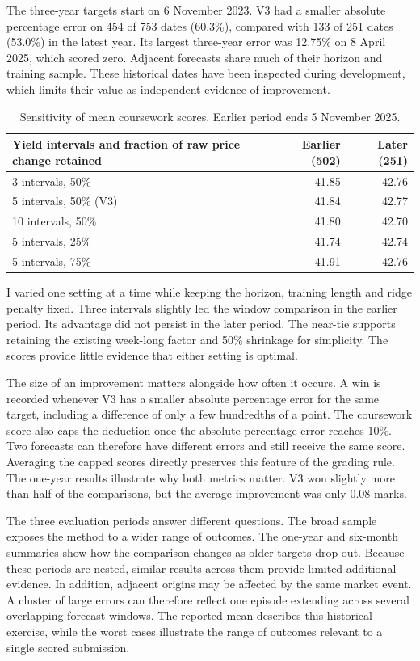 \documentclass[11pt,a4paper]{article}
\begin{document}
The three-year targets start on 6 November 2023. V3 had a smaller absolute percentage error on 454 of 753 dates (60.3\%), compared with 133 of 251 dates (53.0\%) in the latest year. Its largest three-year error was 12.75\% on 8 April 2025, which scored zero. Adjacent forecasts share much of their horizon and training sample. These historical dates have been inspected during development, which limits their value as independent evidence of improvement.

\begin{table}[htbp]
\centering
\caption{Sensitivity of mean coursework scores. Earlier period ends 5 November 2025.}
\begin{tabular}{@{}lrr@{}}
\toprule
Yield intervals and fraction of raw price change retained & Earlier (502) & Later (251)\\
\midrule
3 intervals, 50\% & 41.85 & 42.76\\
5 intervals, 50\% (V3) & 41.84 & 42.77\\
10 intervals, 50\% & 41.80 & 42.70\\
5 intervals, 25\% & 41.74 & 42.74\\
5 intervals, 75\% & 41.91 & 42.76\\
\bottomrule
\end{tabular}
\end{table}

I varied one setting at a time while keeping the horizon, training length and ridge penalty fixed. Three intervals slightly led the window comparison in the earlier period. Its advantage did not persist in the later period. The near-tie supports retaining the existing week-long factor and 50\% shrinkage for simplicity. The scores provide little evidence that either setting is optimal.

The size of an improvement matters alongside how often it occurs. A win is recorded whenever V3 has a smaller absolute percentage error for the same target, including a difference of only a few hundredths of a point. The coursework score also caps the deduction once the absolute percentage error reaches 10\%. Two forecasts can therefore have different errors and still receive the same score. Averaging the capped scores directly preserves this feature of the grading rule. The one-year results illustrate why both metrics matter. V3 won slightly more than half of the comparisons, but the average improvement was only 0.08 marks.

The three evaluation periods answer different questions. The broad sample exposes the method to a wider range of outcomes. The one-year and six-month summaries show how the comparison changes as older targets drop out. Because these periods are nested, similar results across them provide limited additional evidence. In addition, adjacent origins may be affected by the same market event. A cluster of large errors can therefore reflect one episode extending across several overlapping forecast windows. The reported mean describes this historical exercise, while the worst cases illustrate the range of outcomes relevant to a single scored submission.
\end{document}
